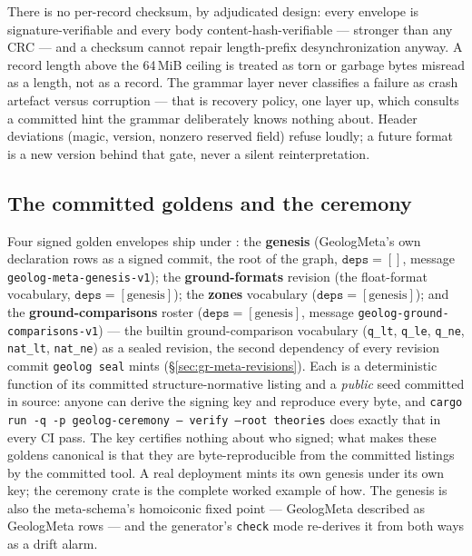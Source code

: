 \noindent There is no per-record checksum, by adjudicated design:
every envelope is signature-verifiable and every body
content-hash-verifiable — stronger than any CRC — and a checksum
cannot repair length-prefix desynchronization anyway. A record length
above the 64\,MiB ceiling is treated as torn or garbage bytes misread
as a length, not as a record. The grammar layer never classifies a
failure as crash artefact versus corruption — that is recovery
policy, one layer up, which consults a committed hint the grammar
deliberately knows nothing about. Header deviations (magic, version,
nonzero reserved field) refuse loudly; a future format is a new
version behind that gate, never a silent reinterpretation.

\subsection{The committed goldens and the ceremony}
\label{sec:gr-goldens}

Four signed golden envelopes ship under : the
\textbf{genesis} (GeologMeta's own declaration rows as a signed
commit, the root of the graph, $\texttt{deps} = []$, message
\texttt{geolog-meta-genesis-v1}); the \textbf{ground-formats}
revision (the float-format vocabulary, $\texttt{deps} =
[\text{genesis}]$); the \textbf{zones} vocabulary
($\texttt{deps} = [\text{genesis}]$); and the
\textbf{ground-comparisons} roster ($\texttt{deps} =
[\text{genesis}]$, message \texttt{geolog-ground-comparisons-v1}) —
the builtin ground-comparison vocabulary (\texttt{q\_lt},
\texttt{q\_le}, \texttt{q\_ne}, \texttt{nat\_lt}, \texttt{nat\_ne})
as a sealed revision, the second dependency of every revision commit
\texttt{geolog seal} mints (\S\ref{sec:gr-meta-revisions}). Each is a deterministic
function of its committed structure-normative listing and a
\emph{public} seed committed in source: anyone can derive the signing
key and reproduce every byte, and
\texttt{cargo run -q -p geolog-ceremony -- verify --root theories}
does exactly that in every CI pass. The key certifies nothing about
who signed; what makes these goldens canonical is that they are
byte-reproducible from the committed listings by the committed tool.
A real deployment mints its own genesis under its own key; the
ceremony crate is the complete worked example of how. The genesis is
also the meta-schema's homoiconic fixed point — GeologMeta described
as GeologMeta rows — and the generator's \texttt{check} mode
re-derives it from  both ways as a
drift alarm.

